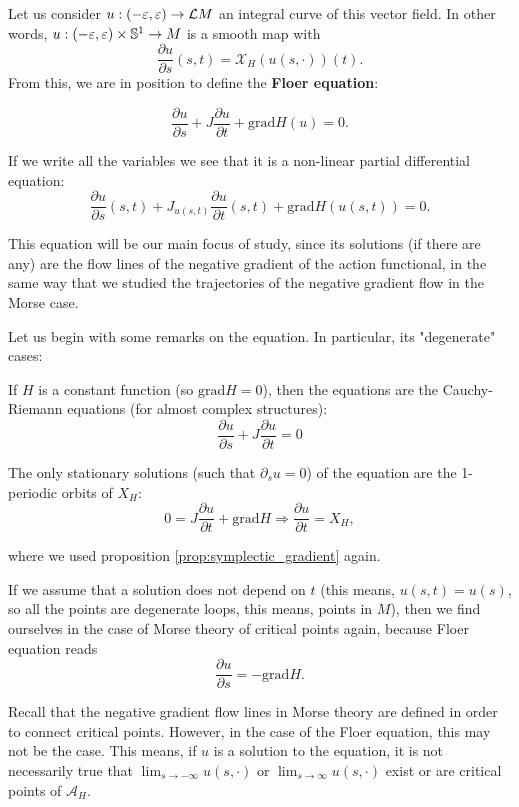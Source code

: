 Let us consider $u : (-\varepsilon,\varepsilon) \rightarrow \mathcal{L}M$ an integral curve of this vector field. In other words, $u : (-\varepsilon,\varepsilon) \times \mathbb{S}^1 \rightarrow M$ is a smooth map with
$$\frac{\partial u}{\partial s} (s,t) = \mathcal{X}_H(u(s,\cdot)) (t) .$$
From this, we are in position to define the {\bf Floer equation}:

\begin{equation} \label{equation:floer_equation}
\frac{\partial u}{\partial s} + J \frac{\partial u}{\partial t} + \text{grad}H(u) = 0 .
\end{equation}

If we write all the variables we see that it is a non-linear partial differential equation:
$$\frac{\partial u}{\partial s}(s,t) + J_{u(s,t)} \frac{\partial u}{\partial t}(s,t) + \text{grad}H(u(s,t)) = 0 .$$

This equation will be our main focus of study, since its solutions (if there are any) are the flow lines of the negative gradient of the action functional, in the same way that we studied the trajectories of the negative gradient flow in the Morse case.

Let us begin with some remarks on the equation. In particular, its "degenerate" cases:

\begin{rmrk}
If $H$ is a constant function (so $\text{grad}H = 0$), then the equations are the Cauchy-Riemann equations (for almost complex structures):
$$\frac{\partial u}{\partial s} + J \frac{\partial u}{\partial t} = 0$$
\end{rmrk}

\begin{rmrk}
The only stationary solutions (such that $\partial_s u = 0$) of the equation are the 1-periodic orbits of $X_H$:
$$0 = J \frac{\partial u}{\partial t} + \text{grad}H \Rightarrow \frac{\partial u}{\partial t} = X_H ,$$

where we used proposition \ref{prop:symplectic_gradient} again.
\end{rmrk}

\begin{rmrk}
If we assume that a solution does not depend on $t$ (this means, $u(s,t) = u(s)$, so all the points are degenerate loops, this means, points in $M$), then we find ourselves in the case of Morse theory of critical points again, because Floer equation reads
$$\frac{\partial u}{\partial s} = - \text{grad}H .$$
\end{rmrk}

Recall that the negative gradient flow lines in Morse theory are defined in order to connect critical points. However, in the case of the Floer equation, this may not be the case. This means, if $u$ is a solution to the equation, it is not necessarily true that $\displaystyle\lim_{s \rightarrow -\infty} u(s,\cdot)$ or $\displaystyle\lim_{s \rightarrow \infty} u(s,\cdot)$ exist or are critical points of $\mathcal{A}_H$.


